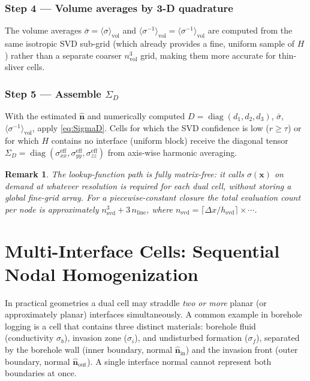 \documentclass[11pt]{article}
\newtheorem{remark}{Remark}
\newcommand{\nn}{\hat{\bm{n}}}
\newcommand{\SD}{\Sigma_D}
\newcommand{\sbar}{\bar{\sigma}}
\newcommand{\invs}{\langle\sigma^{-1}\rangle_{\mathrm{vol}}}
\begin{document}
\subsubsection*{Step 4 — Volume averages by 3-D quadrature}

The volume averages
$\sbar = \langle\sigma\rangle_\mathrm{vol}$ and
$\invs = \langle\sigma^{-1}\rangle_\mathrm{vol}$
are computed from the same isotropic SVD sub-grid (which already provides
a fine, uniform sample of $H$) rather than a separate coarser $n_\mathrm{vol}^3$
grid, making them more accurate for thin-sliver cells.

\subsubsection*{Step 5 — Assemble $\SD$}

With the estimated $\nn$ and numerically computed $D = \operatorname{diag}(d_1,d_2,d_3)$,
$\sbar$, $\invs$, apply \eqref{eq:SigmaD}.  Cells for which the SVD
confidence is low ($r \geq \tau$) or for which $H$ contains no interface
(uniform block) receive the diagonal tensor
$\SD = \operatorname{diag}(\sigma_{xx}^{\mathrm{eff}}, \sigma_{yy}^{\mathrm{eff}}, \sigma_{zz}^{\mathrm{eff}})$
from axis-wise harmonic averaging.

\begin{remark}
The lookup-function path is fully matrix-free: it calls $\sigma(\bm{x})$
on demand at whatever resolution is required for each dual cell, without
storing a global fine-grid array.  For a piecewise-constant closure the
total evaluation count per node is approximately $n_\mathrm{svd}^3 + 3\,n_\mathrm{line}$,
where $n_\mathrm{svd} = \lceil \Delta x / h_\mathrm{svd}\rceil \times \cdots$.
\end{remark}

\section{Multi-Interface Cells: Sequential Nodal Homogenization}\label{sec:multilayer}

In practical geometries a dual cell may straddle \emph{two or more} planar
(or approximately planar) interfaces simultaneously.  A common example in
borehole logging is a cell that contains three distinct materials:
borehole fluid (conductivity $\sigma_b$), invasion zone ($\sigma_i$), and
undisturbed formation ($\sigma_f$), separated by the borehole wall
(inner boundary, normal $\nn_\mathrm{in}$) and the invasion front
(outer boundary, normal $\nn_\mathrm{out}$).  A single interface normal
cannot represent both boundaries at once.
\end{document}
